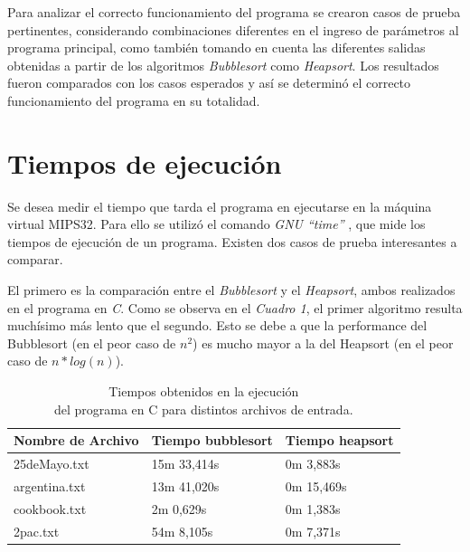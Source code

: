 \documentclass{article}
\begin{document}
	Para analizar el correcto funcionamiento del programa se crearon casos de prueba pertinentes, considerando combinaciones diferentes en el ingreso de parámetros al programa principal, como también tomando en cuenta las diferentes salidas obtenidas a partir de los algoritmos \textit{Bubblesort} como \textit{Heapsort}. Los resultados fueron comparados con los casos esperados y así se determinó el correcto funcionamiento del programa en su totalidad.
\bigskip



\section{Tiempos de ejecución}

	\par
	Se desea medir el tiempo que tarda el programa en ejecutarse en la máquina virtual MIPS32. Para ello se utilizó el comando \textit{GNU ``time''} \cite{TIME}, que mide los tiempos de ejecución de un programa. Existen dos casos de prueba interesantes a comparar. 
	\par
	El primero es la comparación entre el \textit{Bubblesort} y el \textit{Heapsort}, ambos realizados en el programa en \textit{C}. Como se observa en el \textit{Cuadro 1}, el primer algoritmo resulta muchísimo más lento que el segundo. Esto se debe a que la performance del Bubblesort (en el peor caso de \(n^2\)) es mucho mayor a la del Heapsort (en el peor caso de \(n*log(n)\)).
	\medskip
	\newpage

	\begin{table}[!hbt]
		\begin{center}
		\begin{tabular}{|>{\centering\arraybackslash}m{3cm}|>{\centering \arraybackslash}m{3cm}|>{\centering \arraybackslash}m{3cm}|}
			\hline
			\rowcolor[gray]{0.9}\textbf{Nombre de Archivo} & \textbf{Tiempo bubblesort} & \textbf{Tiempo heapsort}\\
			\hline
			\centering 25deMayo.txt & 15m 33,414s & 0m 3,883s \\
			\hline
			\centering argentina.txt & 13m 41,020s & 0m 15,469s \\
			\hline
			\centering cookbook.txt & 2m 0,629s & 0m 1,383s \\
			\hline
			\centering 2pac.txt & 54m 8,105s & 0m 7,371s \\
			\hline
		\end{tabular}
		\smallskip
		\caption{Tiempos obtenidos en la ejecución\\ del programa en C para distintos archivos de entrada.}
		\end{center}
	\end{table}
	\bigskip
	
\end{document}
